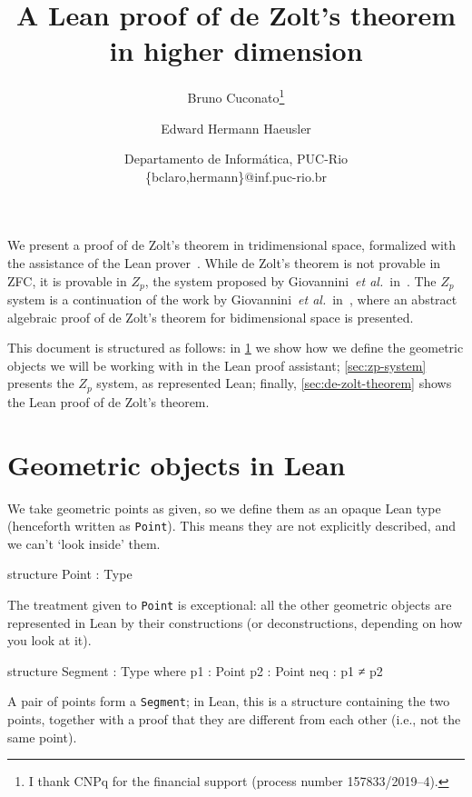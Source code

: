 \documentclass[12pt]{article} %
\title{A Lean proof of de Zolt's theorem in higher dimension} %
\author{Bruno Cuconato\thanks{I thank CNPq for the financial support (process number 157833/2019–4).} \and Edward Hermann Haeusler} %
\date{Departamento de Informática, PUC-Rio\\ \{bclaro,hermann\}@inf.puc-rio.br}
\newcommand{\point}{\texttt{Point}} %
\newcommand{\segment}{\texttt{Segment}} %
\begin{document}
\maketitle %


We present a proof of de Zolt's theorem in tridimensional space, formalized with the assistance of the Lean prover~\cite{demoura2015lean,demoura21lean4}. %
While de Zolt's theorem is not provable in ZFC, it is provable in \(Z_{p}\), the system proposed by Giovannini~\textit{et al.}~in~\cite[§5]{giovannini2021postulado}. %
The \(Z_{p}\) system is a continuation of the work by Giovannini~\textit{et al.}~in~\cite{giovannini2022zolt}, where an abstract algebraic proof of de Zolt's theorem for bidimensional space is presented. %

This document is structured as follows: in \cref{sec:geom-objects-lean} we show how we define the geometric objects we will be working with in the Lean proof assistant; \cref{sec:zp-system} presents the \(Z_{p}\) system, as represented Lean; finally, \cref{sec:de-zolt-theorem} shows the Lean proof of de Zolt's theorem. %


\section{Geometric objects in Lean}\label{sec:geom-objects-lean} %

We take geometric points as given, so we define them as an opaque Lean type (henceforth written as \point). %
This means they are not explicitly described, and we can't ‘look inside’ them. %

\begin{leancode}
structure Point : Type
\end{leancode}
The treatment given to \point{} is exceptional: all the other geometric objects are represented in Lean by their constructions (or deconstructions, depending on how you look at it). %

\begin{leancode}
structure Segment : Type where
  p1 : Point
  p2 : Point
  neq : p1 ≠ p2
\end{leancode}

A pair of points form a \segment; in Lean, this is a structure
containing the two points, together with a proof that they are
different from each other (i.e., not the same point). %
\end{document}
